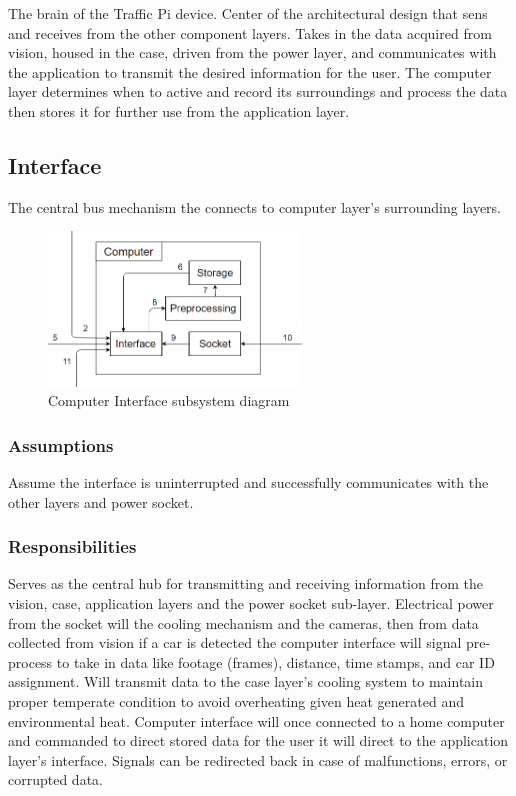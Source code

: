 The brain of the Traffic Pi device. Center of the architectural design that sens and receives from the other component layers. Takes in the data acquired from vision, housed in the case, driven from the power layer, and communicates with the application to transmit the desired information for the user. The computer layer determines when to active and record its surroundings and process the data then stores it for further use from the application layer.

\subsection{Interface}
The central bus mechanism the connects to computer layer's surrounding layers.

\begin{figure}[h!]
	\centering
 	\includegraphics[width=0.60\textwidth]{images/computer_subsystem.png}
 \caption{Computer Interface subsystem diagram}
\end{figure}

\subsubsection{Assumptions}
Assume the interface is uninterrupted and successfully communicates with the other layers and power socket.

\subsubsection{Responsibilities}
Serves as the central hub for transmitting and receiving information from the vision, case, application layers and the power socket sub-layer. Electrical power from the socket will the cooling mechanism and the cameras, then from data collected from vision if a car is detected the computer interface will signal pre-process to take in data like footage (frames), distance, time stamps, and car ID assignment. Will transmit data to the case layer's cooling system to maintain proper temperate condition to avoid overheating given heat generated and environmental heat. Computer interface will once connected to a home computer and commanded to direct stored data for the user it will direct to the application layer's interface. Signals can be redirected back in case of malfunctions, errors, or corrupted data.

